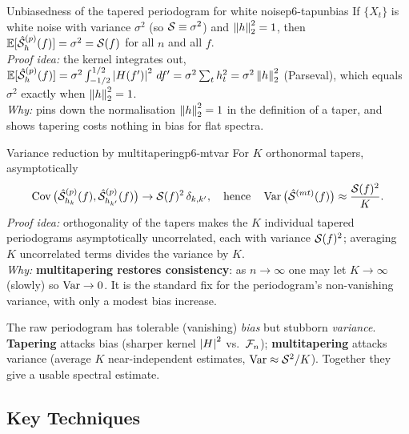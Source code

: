 \begin{corollary}{Unbiasedness of the tapered periodogram for white noise}{p6-tapunbias}
If $\{X_t\}$ is white noise with variance $\sigma^2$ (so $\mathcal{S}\equiv\sigma^2$)
and $\left\lVert h \right\rVert_2^2=1$, then $\mathbb{E}[\hat{\mathcal{S}}^{(p)}_h(f)]=\sigma^2=\mathcal{S}(f)$ for all
$n$ and all $f$.\\[2pt]
\textit{Proof idea:} the kernel integrates out,
$\mathbb{E}[\hat{\mathcal{S}}^{(p)}_h(f)]=\sigma^2\int_{-1/2}^{1/2}\left\lvert H(f') \right\rvert^2\,df'
=\sigma^2\sum_{t}h_t^2=\sigma^2\left\lVert h \right\rVert_2^2$ (Parseval), which equals
$\sigma^2$ exactly when $\left\lVert h \right\rVert_2^2=1$.\\
\textit{Why:} pins down the normalisation $\left\lVert h \right\rVert_2^2=1$ in the definition of
a taper, and shows tapering costs nothing in bias for flat spectra.
\end{corollary}

\begin{theorem}{Variance reduction by multitapering}{p6-mtvar}
For $K$ orthonormal tapers, asymptotically
\[
\operatorname{Cov}\big(\hat{\mathcal{S}}^{(p)}_{h_k}(f),\hat{\mathcal{S}}^{(p)}_{h_{k'}}(f)\big)
\to\mathcal{S}(f)^2\,\delta_{k,k'},
\quad\text{hence}\quad
\operatorname{Var}\big(\hat{\mathcal{S}}^{(mt)}(f)\big)\approx\frac{\mathcal{S}(f)^2}{K}.
\]
\textit{Proof idea:} orthogonality of the tapers makes the $K$ individual
tapered periodograms asymptotically uncorrelated, each with variance
$\mathcal{S}(f)^2$; averaging $K$ uncorrelated terms divides the variance by $K$.\\
\textit{Why:} \textbf{multitapering restores consistency}: as $n\to\infty$ one
may let $K\to\infty$ (slowly) so $\operatorname{Var}\to0$. It is the standard fix for the
periodogram's non-vanishing variance, with only a modest bias increase.
\end{theorem}

\begin{intuition}
The raw periodogram has tolerable (vanishing) \emph{bias} but stubborn
\emph{variance}. \textbf{Tapering} attacks bias (sharper kernel
$\left\lvert H \right\rvert^2$ vs.\ $\mathcal{F}_n$); \textbf{multitapering} attacks variance (average
$K$ near-independent estimates, $\operatorname{Var}\approx\mathcal{S}^2/K$). Together they give a
usable spectral estimate.
\end{intuition}

\subsection{Key Techniques}

